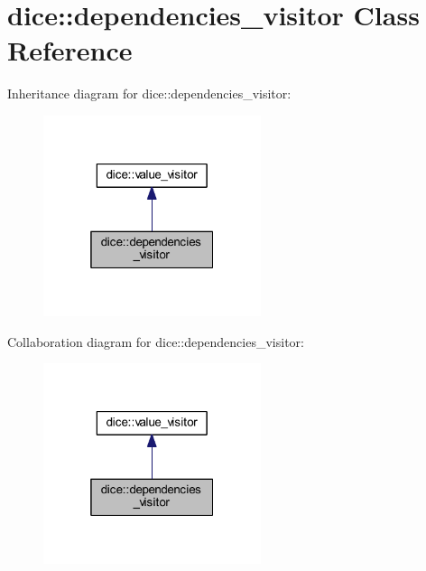 \hypertarget{classdice_1_1dependencies__visitor}{}\section{dice\+:\+:dependencies\+\_\+visitor Class Reference}
\label{classdice_1_1dependencies__visitor}


Inheritance diagram for dice\+:\+:dependencies\+\_\+visitor\+:\nopagebreak
\begin{figure}[H]
\begin{center}
\leavevmode
\includegraphics[width=181pt]{classdice_1_1dependencies__visitor__inherit__graph}
\end{center}
\end{figure}


Collaboration diagram for dice\+:\+:dependencies\+\_\+visitor\+:\nopagebreak
\begin{figure}[H]
\begin{center}
\leavevmode
\includegraphics[width=181pt]{classdice_1_1dependencies__visitor__coll__graph}
\end{center}
\end{figure}
